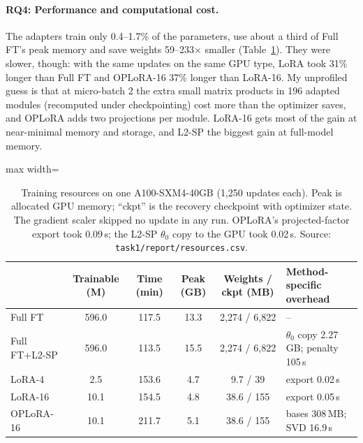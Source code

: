 \documentclass{article}
\begin{document}
\paragraph{RQ4: Performance and computational cost.} The adapters train only 0.4--1.7\% of the parameters, use about a third of Full FT's peak memory and save weights 59--233$\times$ smaller (Table~\ref{tab:t1res}). They were slower, though: with the same updates on the same GPU type, LoRA took 31\% longer than Full FT and OPLoRA-16 37\% longer than LoRA-16. My unprofiled guess is that at micro-batch 2 the extra small matrix products in 196 adapted modules (recomputed under checkpointing) cost more than the optimizer saves, and OPLoRA adds two projections per module. LoRA-16 gets most of the gain at near-minimal memory and storage, and L2-SP the biggest gain at full-model memory.

\begin{table}[t]\centering\footnotesize\setlength{\tabcolsep}{4pt}
\begin{adjustbox}{max width=\linewidth}\begin{tabular}{lccccp{3.6cm}}\toprule
 & Trainable (M) & Time (min) & Peak (GB) & Weights / ckpt (MB) & Method-specific overhead \\\midrule
Full FT       & 596.0 & 117.5 & 13.3 & 2{,}274 / 6{,}822 & -- \\
Full FT+L2-SP & 596.0 & 113.5 & 15.5 & 2{,}274 / 6{,}822 & $\theta_0$ copy 2.27\,GB; penalty 105\,s \\
LoRA-4        & 2.5   & 153.6 & 4.7  & 9.7 / 39   & export 0.02\,s \\
LoRA-16       & 10.1  & 154.5 & 4.8  & 38.6 / 155 & export 0.05\,s \\
OPLoRA-16     & 10.1  & 211.7 & 5.1  & 38.6 / 155 & bases 308\,MB; SVD 16.9\,s \\\bottomrule
\end{tabular}\end{adjustbox}
\caption{Training resources on one A100-SXM4-40GB (1{,}250 updates each). Peak is allocated GPU memory; ``ckpt'' is the recovery checkpoint with optimizer state. The gradient scaler skipped no update in any run. OPLoRA's projected-factor export took 0.09\,s; the L2-SP $\theta_0$ copy to the GPU took 0.02\,s. Source: \texttt{task1/report/resources.csv}.}\label{tab:t1res}
\end{table}
\end{document}
